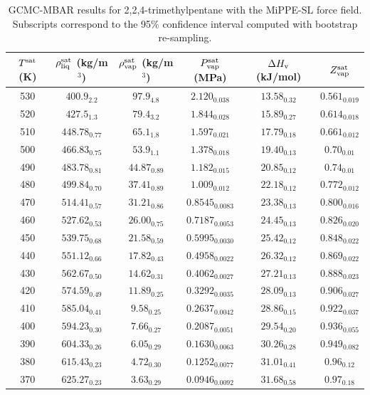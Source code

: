 \documentclass[journal=jctc,manuscript=article]{achemso}
\begin{document}
\begin{table}[htb!]
	\caption{GCMC-MBAR results for 2,2,4-trimethylpentane with the MiPPE-SL force field. Subscripts correspond to the 95\% confidence interval computed with bootstrap re-sampling.}
	\begin{center}
		\begin{tabular}{|c|c|c|c|c|c|}
			\hline
			$T^{\rm sat}$ (K) & $\rho_{\rm liq}^{\rm sat}$ (kg/m$^3$) & $\rho_{\rm vap}^{\rm sat}$ (kg/m$^3$) & $P_{\rm vap}^{\rm sat}$ (MPa) & $\Delta H_{\rm v}$ (kJ/mol) & $Z_{\rm vap}^{\rm sat}$ \\ \hline
			530 & $400.9_{2.2}$ & $97.9_{4.8}$ & $2.120_{0.038}$ & $13.58_{0.32}$ & $0.561_{0.019}$ \\
			520 & $427.5_{1.3}$ & $79.4_{3.2}$ & $1.844_{0.028}$ & $15.89_{0.27}$ & $0.614_{0.018}$ \\
			510 & $448.78_{0.77}$ & $65.1_{1.8}$ & $1.597_{0.021}$ & $17.79_{0.18}$ & $0.661_{0.012}$ \\
			500 & $466.83_{0.75}$ & $53.9_{1.1}$ & $1.378_{0.018}$ & $19.40_{0.13}$ & $0.70_{0.01}$ \\
			490 & $483.78_{0.81}$ & $44.87_{0.89}$ & $1.182_{0.015}$ & $20.85_{0.12}$ & $0.74_{0.01}$ \\
			480 & $499.84_{0.70}$ & $37.41_{0.89}$ & $1.009_{0.012}$ & $22.18_{0.12}$ & $0.772_{0.012}$ \\
			470 & $514.41_{0.57}$ & $31.21_{0.86}$ & $0.8545_{0.0083}$ & $23.38_{0.13}$ & $0.800_{0.016}$ \\
			460 & $527.62_{0.53}$ & $26.00_{0.75}$ & $0.7187_{0.0053}$ & $24.45_{0.13}$ & $0.826_{0.020}$ \\
			450 & $539.75_{0.68}$ & $21.58_{0.59}$ & $0.5995_{0.0030}$ & $25.42_{0.12}$ & $0.848_{0.022}$ \\
			440 & $551.12_{0.66}$ & $17.82_{0.43}$ & $0.4958_{0.0022}$ & $26.32_{0.12}$ & $0.869_{0.022}$ \\
			430 & $562.67_{0.50}$ & $14.62_{0.31}$ & $0.4062_{0.0027}$ & $27.21_{0.13}$ & $0.888_{0.023}$ \\
			420 & $574.59_{0.49}$ & $11.89_{0.25}$ & $0.3292_{0.0035}$ & $28.09_{0.13}$ & $0.906_{0.027}$ \\
			410 & $585.04_{0.41}$ & $9.58_{0.25}$ & $0.2637_{0.0042}$ & $28.86_{0.15}$ & $0.922_{0.037}$ \\
			400 & $594.23_{0.30}$ & $7.66_{0.27}$ & $0.2087_{0.0051}$ & $29.54_{0.20}$ & $0.936_{0.055}$ \\
			390 & $604.33_{0.26}$ & $6.05_{0.29}$ & $0.1630_{0.0063}$ & $30.26_{0.28}$ & $0.949_{0.082}$ \\
			380 & $615.43_{0.23}$ & $4.72_{0.30}$ & $0.1252_{0.0077}$ & $31.01_{0.41}$ & $0.96_{0.12}$ \\
			370 & $625.27_{0.23}$ & $3.63_{0.29}$ & $0.0946_{0.0092}$ & $31.68_{0.58}$ & $0.97_{0.18}$ \\
			\hline
		\end{tabular}
	\end{center}
\end{table}
\end{document}
